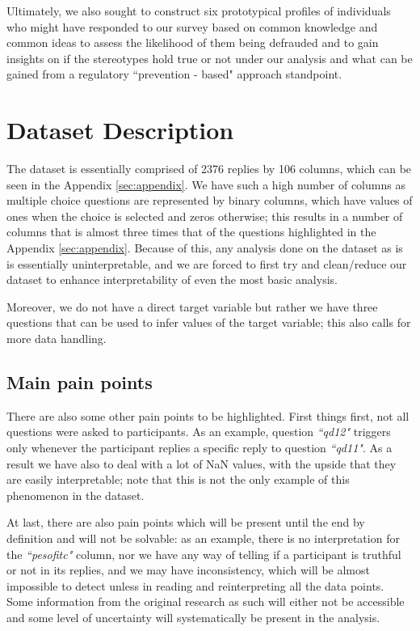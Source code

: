 \documentclass[a4paper,11pt]{article}
\begin{document}
Ultimately, we also sought to construct six prototypical profiles of individuals who might have responded to our survey based on common knowledge and common ideas to assess the likelihood of them being defrauded and to gain insights on if the stereotypes hold true or not under our analysis and what can be gained from a regulatory ``prevention - based" approach standpoint.

\section{Dataset Description}
The dataset is essentially comprised of 2376 replies by 106 columns, which can be seen in the Appendix \ref{sec:appendix}. We have such a high number of columns as multiple choice questions are represented by binary columns, which have values of ones when the choice is selected and zeros otherwise; this results in a number of columns that is almost three times that of the questions highlighted in the Appendix \ref{sec:appendix}. Because of this, any analysis done on the dataset as is is essentially uninterpretable, and we are forced to first try and clean/reduce our dataset to enhance interpretability of even the most basic analysis.

Moreover, we do not have a direct target variable but rather we have three questions that can be used to infer values of the target variable; this also calls for more data handling.
\subsection{Main pain points}
There are also some other pain points to be highlighted. First things first, not all questions were asked to participants. As an example, question \textit{``qd12"} triggers only whenever the participant replies a specific reply to question \textit{``qd11"}. As a result we have also to deal with a lot of NaN values, with the upside that they are easily interpretable; note that this is not the only example of this phenomenon in the dataset. 

At last, there are also pain points which will be present until the end by definition and will not be solvable: as an example, there is no interpretation for the \textit{``pesofitc"} column, nor we have any way of telling if a participant is truthful or not in its replies, and we may have inconsistency, which will be almost impossible to detect unless in reading and reinterpreting all the data points. Some information from the original research as such will either not be accessible and some level of uncertainty will systematically be present in the analysis.
\end{document}
